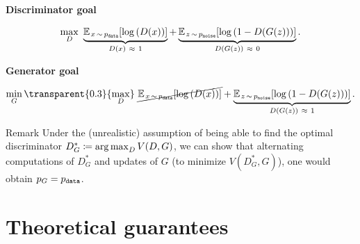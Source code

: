 \documentclass{beamer}
\begin{document}
	\begin{frame}
		\begin{center} \textbf{Discriminator goal} \end{center}
		\begin{equation*}
			\max_{D} \ \underbrace{\mean[x \sim p_\text{\texttt{data}}]{\log{D(x)}}}_{D(x) \ \approx \ 1} + \underbrace{\mean[z \sim p_\text{\texttt{noise}}]{\log{1 - D(G(z))}}}_{D(G(z)) \ \approx \ 0}.
		\end{equation*}
		\begin{center} \textbf{Generator goal} \end{center}
		\begin{equation*}
			\min_{G} {\transparent{0.3}{\max_{D}}} \ \cancel{\mean[x \sim p_\text{\texttt{data}}]{\log{D(x)}}} + \underbrace{\mean[z \sim p_\text{\texttt{noise}}]{\log{1 - D(G(z))}}}_{D(G(z)) \ \approx \ 1}.
		\end{equation*}
		\begin{block}{Remark}
			Under the (unrealistic) assumption of being able to find the optimal discriminator $D^*_G \coloneqq \operatorname*{arg\,max}_{D} V(D, G)$, we can show that alternating computations of $D^*_G$ and updates of $G$ (to minimize $V(D^*_G, G)$), one would obtain $p_G = p_{\text{\texttt{data}}}$.
		\end{block}
	\end{frame}
	

	\section{Theoretical guarantees}
\end{document}
